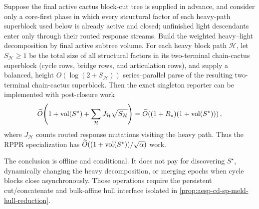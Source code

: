 \begin{proposition}
\label{prop:aesp-cd-cactus-offline-hld}
Suppose the final active cactus block-cut tree is supplied in advance, and
consider only a core-first phase in which every structural factor of each
heavy-path superblock used below is already active and closed; unfinished
light descendants enter only through their routed response streams.  Build
the weighted heavy--light decomposition by final active subtree volume.  For
each heavy block path $\mathcal H$, let
$S_{\mathcal H}\geq1$ be the total size of all structural factors in its
two-terminal chain-cactus superblock (cycle rows, bridge rows, and articulation
rows), and supply a balanced,
height $O(\log(2+S_{\mathcal H}))$ series--parallel parse of the resulting two-terminal
chain-cactus superblock.  Then the exact singleton reporter can be implemented
with post-closure work
\begin{equation}
 \widetilde O\!\left(
   1+\operatorname{vol}(S^\star)+
   \sum_{\mathcal H}J_{\mathcal H}\sqrt{S_{\mathcal H}}
 \right)
 =\widetilde O\!\left(
   (1+R_\star)(1+\operatorname{vol}(S^\star))
 \right),
 \label{eq:aesp-cd-cactus-offline-hld-work}
\end{equation}
where $J_{\mathcal H}$ counts routed response mutations visiting the heavy path.
Thus the RPPR specialization has
$\widetilde O((1+\operatorname{vol}(S^\star))/\sqrt\alpha)$ work.

The conclusion is offline and conditional.  It does not pay for discovering
$S^\star$, dynamically changing the heavy decomposition, or merging epochs
when cycle blocks close asynchronously.  Those operations require the
persistent cut/concatenate and bulk-affine hull interface isolated in
\cref{prop:aesp-cd-sp-meld-hull-reduction}.
\end{proposition}

